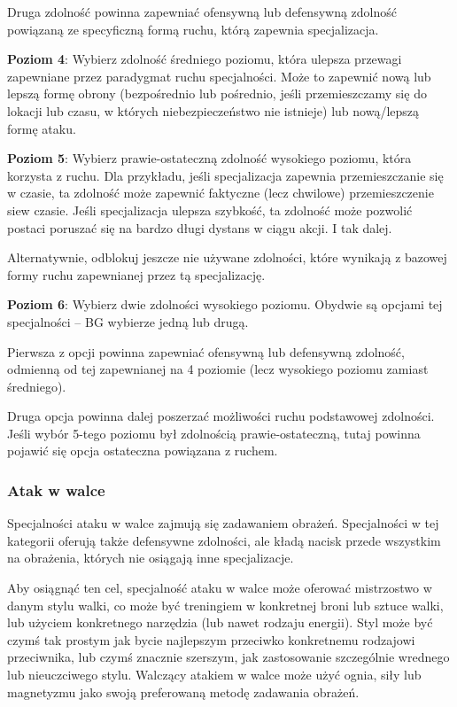 Druga zdolność powinna zapewniać ofensywną lub defensywną zdolność powiązaną ze specyficzną formą ruchu, którą zapewnia specjalizacja.

\textbf{Poziom 4}: Wybierz zdolność średniego poziomu, która ulepsza przewagi zapewniane przez paradygmat ruchu specjalności. Może to zapewnić nową lub lepszą formę obrony (bezpośrednio lub pośrednio, jeśli przemieszczamy się do lokacji lub czasu, w których niebezpieczeństwo nie istnieje) lub nową/lepszą formę ataku.

\textbf{Poziom 5}: Wybierz prawie-ostateczną zdolność wysokiego poziomu, która korzysta z ruchu. Dla przykładu, jeśli specjalizacja zapewnia przemieszczanie się w czasie, ta zdolność może zapewnić faktyczne (lecz chwilowe) przemieszczenie siew czasie. Jeśli specjalizacja ulepsza szybkość, ta zdolność może pozwolić postaci poruszać się na bardzo długi dystans w ciągu akcji. I tak dalej.

Alternatywnie, odblokuj jeszcze nie używane zdolności, które wynikają z bazowej formy ruchu zapewnianej przez tą specjalizację. 

\textbf{Poziom 6}: Wybierz dwie zdolności wysokiego poziomu. Obydwie są opcjami tej specjalności – BG wybierze jedną lub drugą.

Pierwsza z opcji powinna zapewniać ofensywną lub defensywną zdolność, odmienną od tej zapewnianej na 4 poziomie (lecz wysokiego poziomu zamiast średniego).

Druga opcja powinna dalej poszerzać możliwości ruchu podstawowej zdolności. Jeśli wybór 5-tego poziomu był zdolnością prawie-ostateczną, tutaj powinna pojawić się opcja ostateczna powiązana z ruchem.

\subsubsection{Atak w walce}

Specjalności ataku w walce zajmują się zadawaniem obrażeń. Specjalności w tej kategorii oferują także defensywne zdolności, ale kładą nacisk przede wszystkim na obrażenia, których nie osiągają inne specjalizacje.

Aby osiągnąć ten cel, specjalność ataku w walce może oferować mistrzostwo w danym stylu walki, co może być treningiem w konkretnej broni lub sztuce walki, lub użyciem konkretnego narzędzia (lub nawet rodzaju energii). Styl może być czymś tak prostym jak bycie najlepszym przeciwko konkretnemu rodzajowi przeciwnika, lub czymś znacznie szerszym, jak zastosowanie szczególnie wrednego lub nieuczciwego stylu. Walczący atakiem w walce może użyć ognia, siły lub magnetyzmu jako swoją preferowaną metodę zadawania obrażeń.

